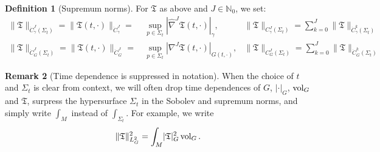 \documentclass[11pt,leqno,textwidth=10cm]{amsart}
\numberwithin{equation}{section}
\theoremstyle{definition}
\newtheorem{definition}{Definition}[section]
\newtheorem{remark}[definition]{Remark}
\theoremstyle{plain}
\newcommand{\1}{\mathbbm{1}}
\newcommand{\N}{\mathbb{N}}
\newcommand{\vol}[1]{{\text{\normalfont{vol}}}_{#1}}
\newcommand{\nabhat}{\hat{\nabla}}
\newcommand{\change}[1]{\color{black}#1\color{black}}
\begin{document}
\begin{definition}[Supremum norms]\label{def:sup-norms} For $\mathfrak{T}$ as above and $J\in\N_0$, we set:
\begin{subequations}
\begin{align}
\|\mathfrak{T}\|_{\dot{C}^J_\gamma(\Sigma_t)}=\|\mathfrak{T}(t,\cdot)\|_{\dot{C}^J_\gamma}=&\,\sup_{p\in \Sigma_t}\left\lvert\nabhat^J\mathfrak{T}(t,\cdot)\right\rvert_\gamma,& \|\mathfrak{T}\|_{C^J_\gamma(\Sigma_t)}=\sum_{k=0}^J\|\mathfrak{T}\|_{\dot{C}^k_\gamma(\Sigma_t)}\\
\|\mathfrak{T}\|_{\dot{C}^J_G(\Sigma_t)}=\|\mathfrak{T}(t,\cdot)\|_{\dot{C}^J_G}=&\,\sup_{p\in \Sigma_t}\left\lvert\nabla^J\mathfrak{T}(t,\cdot)\right\rvert_{G(t,\cdot)},& \|\mathfrak{T}\|_{C^J_G(\Sigma_t)}=\sum_{k=0}^J\|\mathfrak{T}\|_{\dot{C}^k_G(\Sigma_t)}
\end{align}
\end{subequations}
\end{definition}

\begin{remark}[Time dependence is \change{suppressed }in notation]
When the choice of $t$ and $\Sigma_t$ is clear from context, we will often drop time dependences of $G$, $\lvert\cdot\rvert_G$, $\vol{G}$ and $\mathfrak{T}$, surpress the hypersurface $\Sigma_t$ in the Sobolev and supremum norms, and simply write $\int_M$ instead of $\int_{\Sigma_t}$. For example, we write
\[\|\mathfrak{T}\|_{L^2_G}^2=\int_M\lvert\mathfrak{T}\rvert_G^2\,\vol{G}\,.\]
\end{remark}
\end{document}
